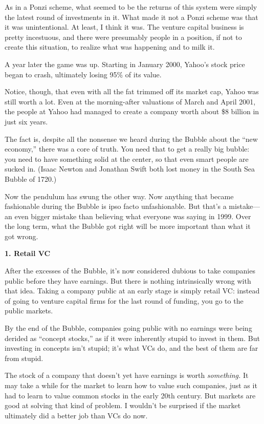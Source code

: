\documentclass[12pt]{book}
\begin{document}
As in a Ponzi scheme, what seemed to be the returns of this system were
simply the latest round of investments in it. What made it not a Ponzi
scheme was that it was unintentional. At least, I think it was. The
venture capital business is pretty incestuous, and there were presumably
people in a position, if not to create this situation, to realize what
was happening and to milk it.

A year later the game was up. Starting in January 2000, Yahoo's stock
price began to crash, ultimately losing 95\% of its value.

Notice, though, that even with all the fat trimmed off its market cap,
Yahoo was still worth a lot. Even at the morning-after valuations of
March and April 2001, the people at Yahoo had managed to create a
company worth about \$8 billion in just six years.

The fact is, despite all the nonsense we heard during the Bubble about
the ``new economy,'' there was a core of truth. You need that to get a
really big bubble: you need to have something solid at the center, so
that even smart people are sucked in. (Isaac Newton and Jonathan Swift
both lost money in the South Sea Bubble of 1720.)

Now the pendulum has swung the other way. Now anything that became
fashionable during the Bubble is ipso facto unfashionable. But that's a
mistake---an even bigger mistake than believing what everyone was saying
in 1999. Over the long term, what the Bubble got right will be more
important than what it got wrong.

\textbf{1. Retail VC}

After the excesses of the Bubble, it's now considered dubious to take
companies public before they have earnings. But there is nothing
intrinsically wrong with that idea. Taking a company public at an early
stage is simply retail VC: instead of going to venture capital firms for
the last round of funding, you go to the public markets.

By the end of the Bubble, companies going public with no earnings were
being derided as ``concept stocks,'' as if it were inherently stupid to
invest in them. But investing in concepts isn't stupid; it's what VCs
do, and the best of them are far from stupid.

The stock of a company that doesn't yet have earnings is worth
\emph{something.} It may take a while for the market to learn how to
value such companies, just as it had to learn to value common stocks in
the early 20th century. But markets are good at solving that kind of
problem. I wouldn't be surprised if the market ultimately did a better
job than VCs do now.
\end{document}
